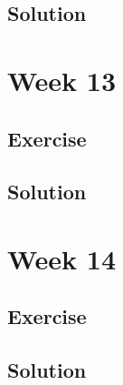\documentclass[
]{book}
\begin{document}
\hypertarget{solution-9}{%
\section{Solution}\label{solution-9}}

\hypertarget{week-13}{%
\chapter{Week 13}\label{week-13}}

\hypertarget{exercise-9}{%
\section{Exercise}\label{exercise-9}}

\hypertarget{solution-10}{%
\section{Solution}\label{solution-10}}

\hypertarget{week-14}{%
\chapter{Week 14}\label{week-14}}

\hypertarget{exercise-10}{%
\section{Exercise}\label{exercise-10}}

\hypertarget{solution-11}{%
\section{Solution}\label{solution-11}}

  
\end{document}
